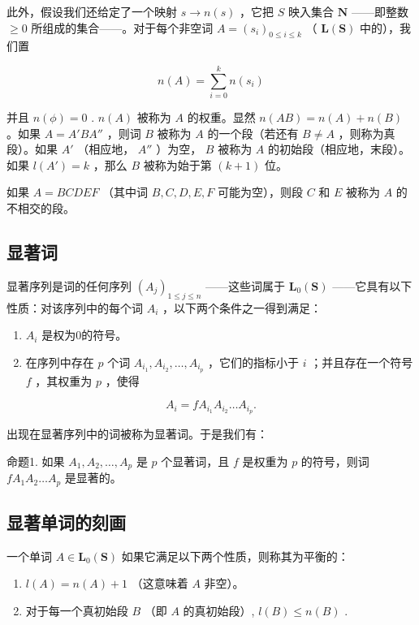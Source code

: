 此外，假设我们还给定了一个映射 \(s \to n(s)\) ，它把 \(S\) 映入集合 \(\mathbf{N}\) ——即整数 \(\geqslant 0\) 所组成的集合——。对于每个非空词 \(A = (s_i)_{0 \leqslant i \leqslant k}\) （ \(\mathbf{L}(\mathbf{S})\) 中的），我们置

\[
n (A) = \sum_ {i = 0} ^ {k} n (s _ {i})
\]

并且 \(n(\phi) = 0\) . \(n(A)\) 被称为 \(A\) 的权重。显然 \(n(AB) = n(A) + n(B)\) 。如果 \(A = A'BA''\) ，则词 \(B\) 被称为 \(A\) 的一个段（若还有 \(B \neq A\) ，则称为真段）。如果 \(A'\) （相应地， \(A''\) ）为空， \(B\) 被称为 \(A\) 的初始段（相应地，末段）。如果 \(l(A') = k\) ，那么 \(B\) 被称为始于第 \((k + 1)\) 位。

如果 \(A = BCDEF\) （其中词 \(B, C, D, E, F\) 可能为空），则段 \(C\) 和 \(E\) 被称为 \(A\) 的不相交的段。

\subsection{显著词}

显著序列是词的任何序列 \((A_{j})_{1\leqslant j\leqslant n}\) ——这些词属于 \(\mathbf{L}_{0}(\mathbf{S})\) ——它具有以下性质：对该序列中的每个词 \(A_{i}\) ，以下两个条件之一得到满足：

\begin{enumerate}
\def\labelenumi{(\arabic{enumi})}
\item
  \(A_{i}\) 是权为0的符号。
\item
  在序列中存在 \(p\) 个词 \(A_{i_1}, A_{i_2}, \ldots, A_{i_p}\) ，它们的指标小于 \(i\) ；并且存在一个符号 \(f\) ，其权重为 \(p\) ，使得
\end{enumerate}

\[
A _ {i} = f A _ {i _ {1}} A _ {i _ {2}} \dots A _ {i _ {p}}.
\]

出现在显著序列中的词被称为显著词。于是我们有：

命题1. 如果 \(A_1, A_2, \ldots, A_p\) 是 \(p\) 个显著词，且 \(f\) 是权重为 \(p\) 的符号，则词 \(fA_1A_2 \ldots A_p\) 是显著的。

\subsection{显著单词的刻画}

一个单词 \(A \in \mathbf{L}_0(\mathbf{S})\) 如果它满足以下两个性质，则称其为平衡的：

\begin{enumerate}
\def\labelenumi{(\arabic{enumi})}
\item
  \(l(A) = n(A) + 1\) （这意味着 \(A\) 非空）。
\item
  对于每一个真初始段 \(B\) （即 \(A\) 的真初始段）, \(l(B) \leqslant n(B)\) .
\end{enumerate}

